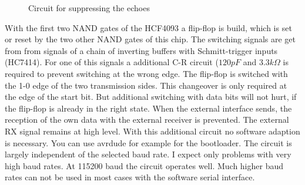 \begin{figure}[H]
\centering
{}
\caption{Circuit for suppressing the echoes}
\label{fig:onewire}
\end{figure}

With the first two NAND gates of the HCF4093 a flip-flop is build,
which is set or reset by the two other NAND gates of this chip.
The switching signals are get from from signals of a chain of inverting buffers
with Schmitt-trigger inputs (HC7414).
For one of this signals a additional C-R circuit (\(120 pF\) and \(3.3 k\Omega\) is
required to prevent switching at the wrong edge.
The flip-flop is switched with the 1-0 edge of the two transmission sides.
This changeover is only required at the edge of the start bit.
But additional switching with data bits will not hurt, if the flip-flop
is already in the right state.
When the external interface sends, the reception of the own data with the
external receiver is prevented. The external RX signal remains at high level.
With this additional circuit no software adaption is necessary.
You can use avrdude for example for the bootloader.
The circuit is largely independent of the selected baud rate.
I expect only problems with very high baud rates.
At 115200 baud the circuit operates well. Much higher baud rates can 
not be used in most cases with the software serial interface.


